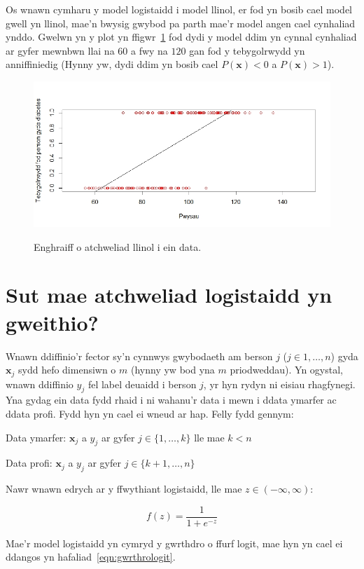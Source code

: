 Os wnawn cymharu y model logistaidd i model llinol, er fod yn bosib cael model gwell yn llinol, mae'n bwysig gwybod pa parth mae'r model angen cael cynhaliad ynddo. Gwelwn yn y plot yn ffigwr~\ref{fig:Enghraifft_o_atchweliad_llinol} fod dydi y model ddim yn cynnal cynhaliad ar gyfer mewnbwn llai na $60$ a fwy na $120$ gan fod y tebygolrwydd yn anniffiniedig (Hynny yw, dydi ddim yn bosib cael $P(\mathbf{x})<0$ a $P(\mathbf{x})>1$). 

\begin{figure}[H]
\begin{center}
\includegraphics[width=0.5\linewidth]{../img/cymharu_llinol.jpeg}
\label{fig:Enghraifft_o_atchweliad_llinol}
\caption{Enghraiff o atchweliad llinol i ein data.}
\end{center}
\end{figure}

\section{Sut mae atchweliad logistaidd yn gweithio?}

Wnawn ddiffinio'r fector sy'n cynnwys gwybodaeth am berson $j$ ($j \in {1,\dots,n}$) gyda $\mathbf{x}_j$ sydd hefo dimensiwn o $m$ (hynny yw bod yna $m$ priodweddau). Yn ogystal, wnawn ddiffinio $y_j$ fel label deuaidd i berson $j$, yr hyn rydyn ni eisiau rhagfynegi. Yna gydag ein data fydd rhaid i ni wahanu'r data i mewn i ddata ymarfer ac ddata profi. Fydd hyn yn cael ei wneud ar hap. Felly fydd gennym:

Data ymarfer: $\mathbf{x}_j$ a $y_j$ ar gyfer $j \in \{ 1,\dots,k\}$ lle mae $k<n$

Data profi: $\mathbf{x}_j$ a $y_j$ ar gyfer $j \in \{ k+1,\dots,n \}$

Nawr wnawn edrych ar y ffwythiant logistaidd, lle mae $z \in (-\infty,\infty)$:

\begin{equation}\label{eqn:gwrthdrologit}	
	f(z) = \frac{1}{1+e^{-z}} 
\end{equation}

Mae'r model logistaidd yn cymryd y gwrthdro o ffurf logit, mae hyn yn cael ei ddangos yn hafaliad~\ref{eqn:gwrthrologit}.

